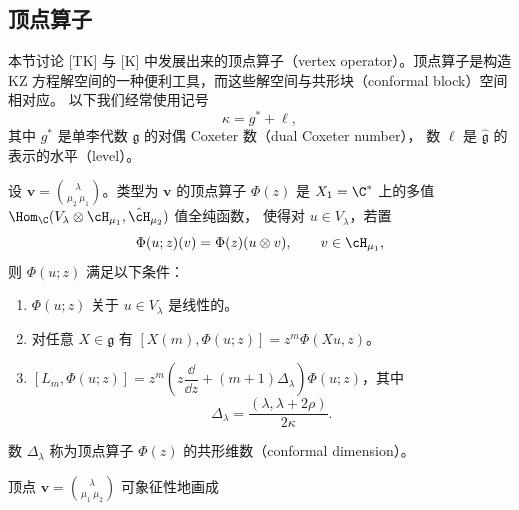 
\subsection{顶点算子}

本节讨论 [TK] 与 [K] 中发展出来的顶点算子（vertex operator）。顶点算子是构造
KZ 方程解空间的一种便利工具，而这些解空间与共形块（conformal block）空间相对应。
以下我们经常使用记号
\begin{equation}
\kappa = g^* + \ell , \tag{6.20}
\end{equation}
其中 $g^*$ 是单李代数 $\mathfrak{g}$ 的对偶 Coxeter 数（dual Coxeter number），
数 $\ell$ 是 $\hat{\mathfrak{g}}$ 的表示的水平（level）。



\begin{definition}[6.9]
设 $\mathbf{v}=\binom{\lambda}{\mu_2\ \mu_1}$。类型为 $\mathbf{v}$ 的顶点算子
$\Phi(z)$ 是 $X_1=\C^*$ 上的多值
$\Hom_\C(V_\lambda\otimes\cH_{\mu_1},\hat{\cH}_{\mu_2})$ 值全纯函数，
使得对 $u\in V_\lambda$，若置
\[
\Phi(u;z)(v)=\Phi(z)(u\otimes v),\qquad v\in\cH_{\mu_1},
\]
则 $\Phi(u;z)$ 满足以下条件：
\begin{enumerate}[label=(V\arabic*)]
\item $\Phi(u;z)$ 关于 $u\in V_\lambda$ 是线性的。
\item 对任意 $X\in\mathfrak{g}$ 有 $[X(m),\Phi(u;z)]=z^m\Phi(Xu,z)$。
\item $[L_m,\Phi(u;z)]=z^m\left(z\dfrac{\dd}{\dd z}+(m+1)\Delta_\lambda\right)
      \Phi(u;z)$，其中
\[
\Delta_\lambda=\frac{(\lambda,\lambda+2\rho)}{2\kappa}.
\]
\end{enumerate}
\end{definition}

数 $\Delta_\lambda$ 称为顶点算子 $\Phi(z)$ 的共形维数（conformal dimension）。

顶点 $\mathbf{v}=\binom{\lambda}{\mu_1\ \mu_2}$ 可象征性地画成

